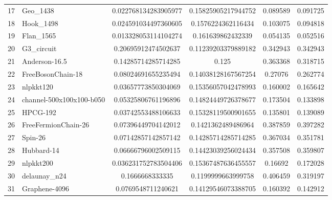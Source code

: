 \begin{tabular}{|l|l|S[round-mode=places,round-precision=4]|S[round-mode=places,round-precision=4]|S[round-mode=places,round-precision=4]|S[round-mode=places,round-precision=4]|}
{17}& {	Geo\_1438                  }	& 0.022768134283905977	& 0.15825905217944752	& 0.089589	& 0.091725	\\
{18}& {	Hook\_1498                 }	& 0.024591034497360605	& 0.1576224362116434	& 0.103075	& 0.094818	\\
{19}& {	Flan\_1565                 }	& 0.013328053114104274	& 0.161639862432339	& 0.054135	& 0.052516	\\
{20}& {	G3\_circuit                }	& 0.20695912474502637	& 0.11239203379889182	& 0.342943	& 0.342943	\\
{21}& {	Anderson-16.5             }	& 0.14285714285714285	& 0.125	& 0.363368	& 0.318715	\\
{22}& {	FreeBosonChain-18         }	& 0.08024691655235494	& 0.14038128167567254	& 0.27076	& 0.262774	\\
{23}& {	nlpkkt120                 }	& 0.03657773850304069	& 0.15356057042478993	& 0.160002	& 0.165642	\\
{24}& {	channel-500x100x100-b050  }	& 0.05325806761196896	& 0.14824449726378677	& 0.173504	& 0.133898	\\
{25}& {	HPCG-192                  }	& 0.03742553488106633	& 0.15328119500901655	& 0.135801	& 0.139089	\\
{26}& {	FreeFermionChain-26       }	& 0.07396449704142012	& 0.1421362489486964	& 0.387859	& 0.397282	\\
{27}& {	Spin-26                   }	& 0.07142857142857142	& 0.14285714285714285	& 0.367034	& 0.351781	\\
{28}& {	Hubbard-14                }	& 0.06666796002509115	& 0.14423039256024434	& 0.357508	& 0.359807	\\
{29}& {	nlpkkt200                 }	& 0.036231752783504406	& 0.15367487636455557	& 0.16692	& 0.172028	\\
{30}& {	delaunay\_n24              }	& 0.1666668333335	& 0.1199999663999758	& 0.406459	& 0.319197	\\
{31}& {	Graphene-4096             }	& 0.0769548711240621	& 0.14129546073388705	& 0.160392	& 0.142912	\\
\bottomrule
\end{tabular}


